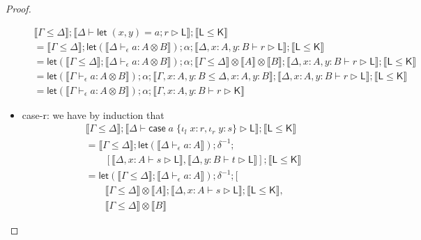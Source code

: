 \documentclass[acmsmall,screen,review]{acmart}
\newcommand{\ms}[1]{\ensuremath{\mathsf{#1}}}
\newcommand{\lto}{:}
\newcommand{\linl}[1]{\iota_l\;{#1}}
\newcommand{\linr}[1]{\iota_r\;{#1}}
\newcommand{\caseexpr}[5]{\ms{case}\;#1\;\{\linl{#2} \lto #3, \linr{#4} \lto #5\}}
\newcommand{\letstmt}[3]{\ensuremath{\ms{let}\;#1 = #2; #3}}
\newcommand{\bhyp}[2]{#1 : #2}
\newcommand{\hasty}[4]{#1 \vdash_{#2} #3: {#4}}
\newcommand{\haslb}[3]{#1 \vdash #2 \rhd #3}
\newcommand{\brle}[1]{{\textsf{#1}}}
\newcommand{\dnt}[1]{\llbracket{#1}\rrbracket}
\newcommand{\lmor}[1]{\ms{let}(#1)}
\begin{document}
\begin{proof}
\begin{itemize}
\begin{equation}
\begin{aligned}
        & \dnt{\Gamma \leq \Delta} 
          ; \dnt{\haslb{\Delta}{\letstmt{(x, y)}{a}{r}}{\ms{L}}} 
          ; \dnt{\ms{L} \leq \ms{K}} \\
        & = \dnt{\Gamma \leq \Delta}
          ; \lmor{\dnt{\hasty{\Delta}{\epsilon}{a}{A \otimes B}}}
          ; \alpha
          ; \dnt{\haslb{\Delta, \bhyp{x}{A}, \bhyp{y}{B}}{r}{\ms{L}}}
          ; \dnt{\ms{L} \leq \ms{K}} \\
        & = \lmor{\dnt{\Gamma \leq \Delta} ; \dnt{\hasty{\Delta}{\epsilon}{a}{A \otimes B}}}
          ; \alpha
          ; \dnt{\Gamma \leq \Delta} \otimes \dnt{A} \otimes \dnt{B}
          ; \dnt{\haslb{\Delta, \bhyp{x}{A}, \bhyp{y}{B}}{r}{\ms{L}}}
          ; \dnt{\ms{L} \leq \ms{K}} \\
        & = \lmor{\dnt{\hasty{\Gamma}{\epsilon}{a}{A \otimes B}}}
          ; \alpha
          ; \dnt{\Gamma, \bhyp{x}{A}, \bhyp{y}{B} \leq \Delta, \bhyp{x}{A}, \bhyp{y}{B}}
          ; \dnt{\haslb{\Delta, \bhyp{x}{A}, \bhyp{y}{B}}{r}{\ms{L}}}
          ; \dnt{\ms{L} \leq \ms{K}} \\
        & = \lmor{\dnt{\hasty{\Gamma}{\epsilon}{a}{A \otimes B}}}
          ; \alpha
          ; \dnt{\haslb{\Gamma, \bhyp{x}{A}, \bhyp{y}{B}}{r}{\ms{K}}}
      \end{aligned}
    \end{equation}
    \item \brle{case-r}: we have by induction that
    \begin{equation}
      \begin{aligned}
        & \dnt{\Gamma \leq \Delta} 
          ; \dnt{\haslb{\Delta}{\caseexpr{a}{x}{r}{y}{s}}{\ms{L}}}
          ; \dnt{\ms{L} \leq \ms{K}} \\
        & = \dnt{\Gamma \leq \Delta}
          ; \lmor{\dnt{\hasty{\Delta}{\epsilon}{a}{A}}}
          ; \delta^{-1}
          ; \\ & \qquad [ 
             \dnt{\haslb{\Delta, \bhyp{x}{A}}{s}{\ms{L}}}, 
             \dnt{\haslb{\Delta, \bhyp{y}{B}}{t}{\ms{L}}}
          ]
          ; \dnt{\ms{L} \leq \ms{K}} \\
        & = \lmor{\dnt{\Gamma \leq \Delta} ; \dnt{\hasty{\Delta}{\epsilon}{a}{A}}}
          ; \delta^{-1}
          ; [ \\ & \qquad 
             \dnt{\Gamma \leq \Delta} \otimes \dnt{A}
               ; \dnt{\haslb{\Delta, \bhyp{x}{A}}{s}{\ms{L}}}
               ; \dnt{\ms{L} \leq \ms{K}}, \\ & \qquad
             \dnt{\Gamma \leq \Delta} \otimes \dnt{B}

\end{aligned}
\end{equation}
\end{itemize}
\end{proof}
\end{document}
